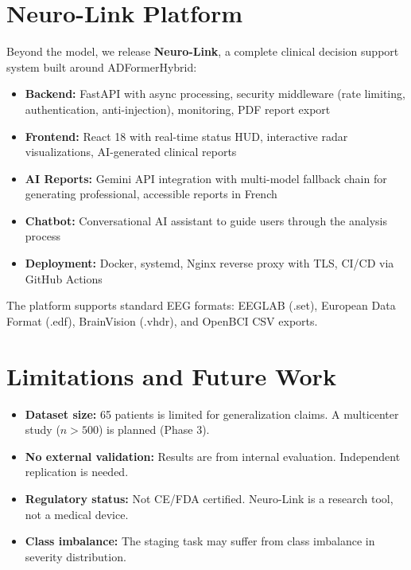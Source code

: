 \documentclass[twocolumn,11pt]{article}
\begin{document}
\section{Neuro-Link Platform}

Beyond the model, we release \textbf{Neuro-Link}, a complete clinical decision support system built around ADFormerHybrid:

\begin{itemize}[nosep]
  \item \textbf{Backend:} FastAPI with async processing, security middleware (rate limiting, authentication, anti-injection), monitoring, PDF report export
  \item \textbf{Frontend:} React 18 with real-time status HUD, interactive radar visualizations, AI-generated clinical reports
  \item \textbf{AI Reports:} Gemini API integration with multi-model fallback chain for generating professional, accessible reports in French
  \item \textbf{Chatbot:} Conversational AI assistant to guide users through the analysis process
  \item \textbf{Deployment:} Docker, systemd, Nginx reverse proxy with TLS, CI/CD via GitHub Actions
\end{itemize}

The platform supports standard EEG formats: EEGLAB (.set), European Data Format (.edf), BrainVision (.vhdr), and OpenBCI CSV exports.

\section{Limitations and Future Work}

\begin{itemize}[nosep]
  \item \textbf{Dataset size:} 65 patients is limited for generalization claims. A multicenter study ($n > 500$) is planned (Phase 3).
  \item \textbf{No external validation:} Results are from internal evaluation. Independent replication is needed.
  \item \textbf{Regulatory status:} Not CE/FDA certified. Neuro-Link is a research tool, not a medical device.
  \item \textbf{Class imbalance:} The staging task may suffer from class imbalance in severity distribution.
\end{itemize}
\end{document}
